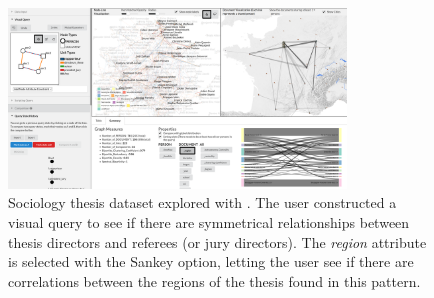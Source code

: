 \begin{figure}[!h]
    \centering
    \includegraphics[width=0.8\textwidth]{static/figures/ComBiNet/Thesis-query01-and-results}
    \caption{Sociology thesis dataset explored with \name. The user constructed a visual query to see if there are symmetrical relationships between thesis directors and referees (or jury directors). The \textit{region} attribute is selected with the Sankey option, letting the user see if there are correlations between the regions of the thesis found in this pattern.  }\label{fig:combinet-thesis-query}
\end{figure}








